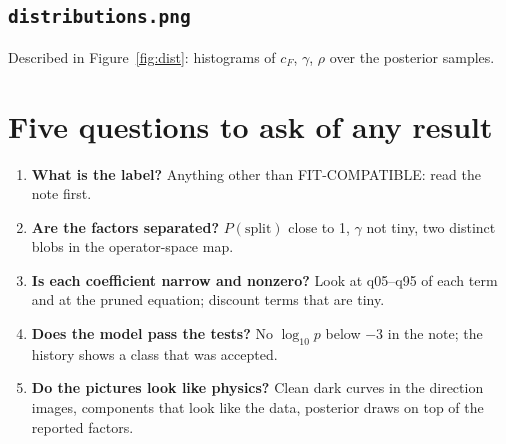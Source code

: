 \documentclass[11pt,a4paper]{article}
\begin{document}
\subsection{\texttt{distributions.png}}
Described in Figure~\ref{fig:dist}: histograms of $c_F$, $\gamma$, $\rho$ over the posterior samples.

\section{Five questions to ask of any result}
\begin{enumerate}
\item \textbf{What is the label?} Anything other than FIT-COMPATIBLE: read the note first.
\item \textbf{Are the factors separated?} $P(\text{split})$ close to 1, $\gamma$ not tiny, two distinct blobs in the operator-space map.
\item \textbf{Is each coefficient narrow and nonzero?} Look at q05--q95 of each term and at the pruned equation; discount terms that are tiny.
\item \textbf{Does the model pass the tests?} No $\log_{10}p$ below $-3$ in the note; the history shows a class that was accepted.
\item \textbf{Do the pictures look like physics?} Clean dark curves in the direction images, components that look like the data, posterior draws on top of the reported factors.
\end{enumerate}
\end{document}
